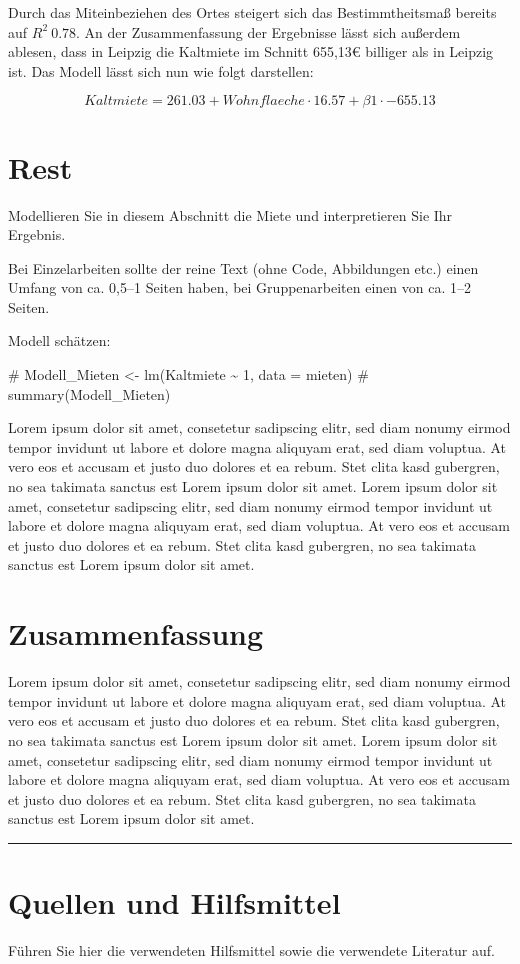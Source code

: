 \documentclass[
  a4paper,
  DIV=11]{scrartcl}
\newenvironment{Shaded}{\begin{snugshade}}{\end{snugshade}}
\newcommand{\CommentTok}[1]{\textcolor[rgb]{0.37,0.37,0.37}{#1}}
\begin{document}
Durch das Miteinbeziehen des Ortes steigert sich das Bestimmtheitsmaß
bereits auf \(R^2 ~ 0.78\). An der Zusammenfassung der Ergebnisse lässt
sich außerdem ablesen, dass in Leipzig die Kaltmiete im Schnitt 655,13€
billiger als in Leipzig ist. Das Modell lässt sich nun wie folgt
darstellen:

\[ Kaltmiete = 261.03 + Wohnflaeche \cdot 16.57 + \beta1 \cdot -655.13 \]

\hypertarget{rest}{%
\section{Rest}\label{rest}}

Modellieren Sie in diesem Abschnitt die Miete und interpretieren Sie Ihr
Ergebnis.

Bei Einzelarbeiten sollte der reine Text (ohne Code, Abbildungen etc.)
einen Umfang von ca. 0,5--1 Seiten haben, bei Gruppenarbeiten einen von
ca. 1--2 Seiten.

Modell schätzen:

\begin{Shaded}
\begin{Highlighting}[]
\CommentTok{\# Modell\_Mieten \textless{}{-} lm(Kaltmiete \textasciitilde{} 1, data = mieten)}
\CommentTok{\# summary(Modell\_Mieten)}
\end{Highlighting}
\end{Shaded}

Lorem ipsum dolor sit amet, consetetur sadipscing elitr, sed diam nonumy
eirmod tempor invidunt ut labore et dolore magna aliquyam erat, sed diam
voluptua. At vero eos et accusam et justo duo dolores et ea rebum. Stet
clita kasd gubergren, no sea takimata sanctus est Lorem ipsum dolor sit
amet. Lorem ipsum dolor sit amet, consetetur sadipscing elitr, sed diam
nonumy eirmod tempor invidunt ut labore et dolore magna aliquyam erat,
sed diam voluptua. At vero eos et accusam et justo duo dolores et ea
rebum. Stet clita kasd gubergren, no sea takimata sanctus est Lorem
ipsum dolor sit amet.

\hypertarget{zusammenfassung}{%
\section{Zusammenfassung}\label{zusammenfassung}}

Lorem ipsum dolor sit amet, consetetur sadipscing elitr, sed diam nonumy
eirmod tempor invidunt ut labore et dolore magna aliquyam erat, sed diam
voluptua. At vero eos et accusam et justo duo dolores et ea rebum. Stet
clita kasd gubergren, no sea takimata sanctus est Lorem ipsum dolor sit
amet. Lorem ipsum dolor sit amet, consetetur sadipscing elitr, sed diam
nonumy eirmod tempor invidunt ut labore et dolore magna aliquyam erat,
sed diam voluptua. At vero eos et accusam et justo duo dolores et ea
rebum. Stet clita kasd gubergren, no sea takimata sanctus est Lorem
ipsum dolor sit amet.

\begin{center}\rule{0.5\linewidth}{0.5pt}\end{center}

\hypertarget{quellen-und-hilfsmittel}{%
\section{Quellen und Hilfsmittel}\label{quellen-und-hilfsmittel}}

Führen Sie hier die verwendeten Hilfsmittel sowie die verwendete
Literatur auf.
\end{document}
